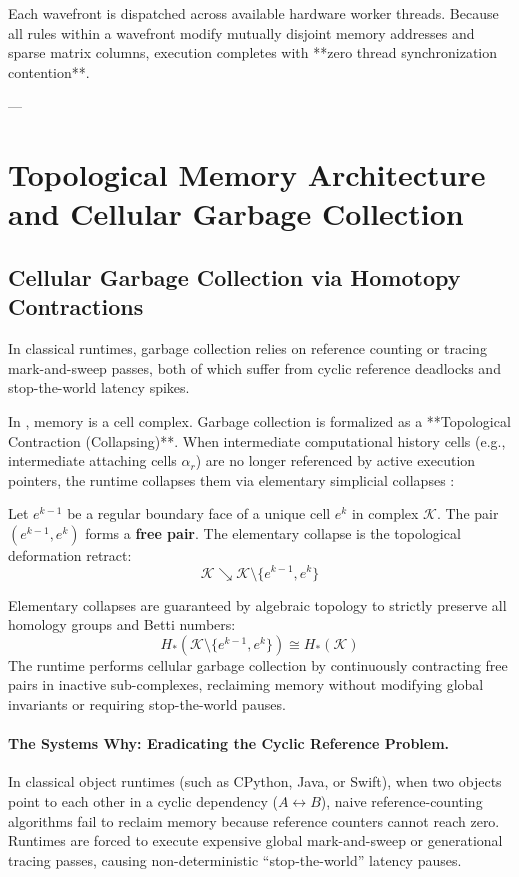 Each wavefront is dispatched across available hardware worker threads. Because all rules within a wavefront modify mutually disjoint memory addresses and sparse matrix columns, execution completes with **zero thread synchronization contention**.

---

\section{Topological Memory Architecture and Cellular Garbage Collection}
\label{sec:topological_gc}

\subsection{Cellular Garbage Collection via Homotopy Contractions}
In classical runtimes, garbage collection relies on reference counting or tracing mark-and-sweep passes, both of which suffer from cyclic reference deadlocks and stop-the-world latency spikes.

In \ToposLang{}, memory is a cell complex. Garbage collection is formalized as a **Topological Contraction (Collapsing)**. When intermediate computational history cells (e.g., intermediate attaching cells $\alpha_r$) are no longer referenced by active execution pointers, the runtime collapses them via elementary simplicial collapses \cite{kozlov2008combinatorial}:
\begin{definition}
Let $e^{k-1}$ be a regular boundary face of a unique cell $e^k$ in complex $\mathcal{K}$. The pair $(e^{k-1}, e^k)$ forms a \textbf{free pair}. The elementary collapse is the topological deformation retract:
\begin{equation}
    \mathcal{K} \searrow \mathcal{K} \setminus \{ e^{k-1}, e^k \}
\end{equation}
\end{definition}
Elementary collapses are guaranteed by algebraic topology to strictly preserve all homology groups and Betti numbers:
\begin{equation}
    H_*(\mathcal{K} \setminus \{e^{k-1}, e^k\}) \cong H_*(\mathcal{K})
\end{equation}
The \ToposLang{} runtime performs cellular garbage collection by continuously contracting free pairs in inactive sub-complexes, reclaiming memory without modifying global invariants or requiring stop-the-world pauses.

\paragraph{The Systems Why: Eradicating the Cyclic Reference Problem.}
In classical object runtimes (such as CPython, Java, or Swift), when two objects point to each other in a cyclic dependency ($A \longleftrightarrow B$), naive reference-counting algorithms fail to reclaim memory because reference counters cannot reach zero. Runtimes are forced to execute expensive global mark-and-sweep or generational tracing passes, causing non-deterministic ``stop-the-world'' latency pauses.

